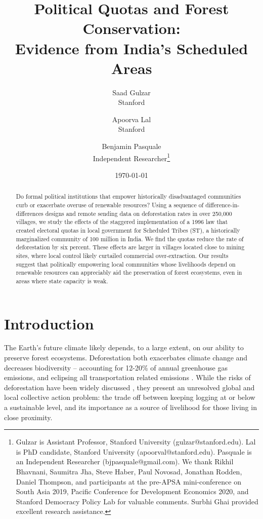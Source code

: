 \documentclass[12pt,reqno]{article}
\title{Political Quotas and Forest Conservation: \\ Evidence
from India's Scheduled Areas}
\author{Saad Gulzar \\ Stanford \and Apoorva Lal \\
Stanford  \and Benjamin Pasquale \\
Independent Researcher\thanks{Gulzar is Assistant Professor, Stanford
University (gulzar@stanford.edu). Lal is PhD candidate, Stanford University (apoorval@stanford.edu). Pasquale is an Independent
Researcher (bjpasquale@gmail.com). We thank Rikhil Bhavnani, Saumitra Jha, Steve Haber, Paul Novosad, Jonathan Rodden, Daniel Thompson, and participants at the pre-APSA mini-conference on South Asia 2019, Pacific Conference for Development Economics 2020, and Stanford Democracy Policy Lab for valuable comments. Surbhi Ghai provided excellent research assistance.}}
\date{\smallskip \today}
\begin{document}
\thispagestyle{empty}

\maketitle

\begin{abstract} \singlespacing

Do formal political institutions that empower historically disadvantaged communities curb or exacerbate overuse of renewable resources? Using a sequence of difference-in-differences designs and remote sending data on deforestation rates in over 250,000 villages, we study the effects of the staggered implementation of a 1996 law that created electoral quotas in local government for Scheduled Tribes (ST), a historically marginalized community of 100 million in India. We find the quotas reduce the rate of deforestation by six percent. These effects are larger in villages located close to mining sites, where local  control likely curtailed commercial over-extraction. Our results suggest that politically empowering local communities whose livelihoods depend on renewable resources can appreciably aid the preservation of forest ecosystems, even in areas where state capacity is weak.
\end{abstract}





\newpage

\setcounter{page}{1}
\section{Introduction} %
\label{sec:introduction}

\linenumbers
\modulolinenumbers[5]



The Earth's future climate likely depends, to a large extent, on our ability to preserve forest ecosystems. Deforestation both exacerbates climate change and decreases biodiversity \parencite{bonan2008forests} -- accounting for 12-20\% of annual greenhouse gas emissions, and eclipsing all transportation related emissions \parencite{solomon2007ipcc}. While the risks of deforestation have been widely discussed \parencite{stern2006economics}, they present an unresolved global and local collective action problem: the trade off between keeping logging at or below a sustainable level, and its importance as a source of livelihood for those living in close proximity. 
\end{document}
